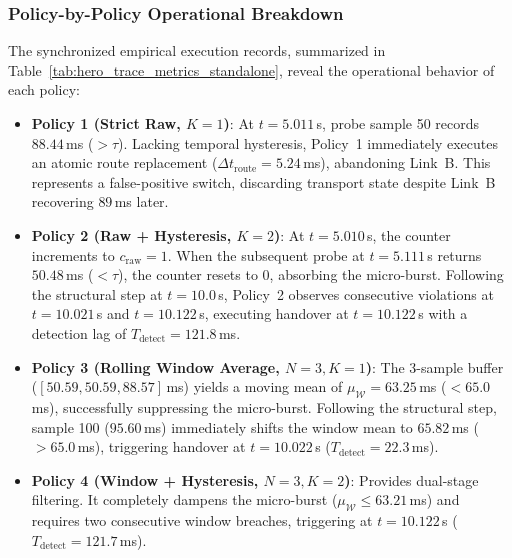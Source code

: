 \subsubsection{Policy-by-Policy Operational Breakdown}

The synchronized empirical execution records, summarized in Table~\ref{tab:hero_trace_metrics_standalone}, reveal the operational behavior of each policy:
\begin{itemize}
    \item \textbf{Policy 1 (Strict Raw, $K=1$)}: At $t = 5.011$\,s, probe sample 50 records $88.44$\,ms ($>\tau$). Lacking temporal hysteresis, Policy~1 immediately executes an atomic route replacement ($\Delta t_{\text{route}} = 5.24$\,ms), abandoning Link~B. This represents a false-positive switch, discarding transport state despite Link~B recovering $89$\,ms later.
    \item \textbf{Policy 2 (Raw + Hysteresis, $K=2$)}: At $t = 5.010$\,s, the counter increments to $c_{\text{raw}} = 1$. When the subsequent probe at $t = 5.111$\,s returns $50.48$\,ms ($<\tau$), the counter resets to 0, absorbing the micro-burst. Following the structural step at $t = 10.0$\,s, Policy~2 observes consecutive violations at $t = 10.021$\,s and $t = 10.122$\,s, executing handover at $t = 10.122$\,s with a detection lag of $T_{\text{detect}} = 121.8$\,ms.
    \item \textbf{Policy 3 (Rolling Window Average, $N=3, K=1$)}: The 3-sample buffer ($[50.59, 50.59, 88.57]$\,ms) yields a moving mean of $\mu_{\mathcal{W}} = 63.25$\,ms ($< 65.0$\,ms), successfully suppressing the micro-burst. Following the structural step, sample 100 ($95.60$\,ms) immediately shifts the window mean to $65.82$\,ms ($> 65.0$\,ms), triggering handover at $t = 10.022$\,s ($T_{\text{detect}} = 22.3$\,ms).
    \item \textbf{Policy 4 (Window + Hysteresis, $N=3, K=2$)}: Provides dual-stage filtering. It completely dampens the micro-burst ($\mu_{\mathcal{W}} \le 63.21$\,ms) and requires two consecutive window breaches, triggering at $t = 10.122$\,s ($T_{\text{detect}} = 121.7$\,ms).
\end{itemize}

